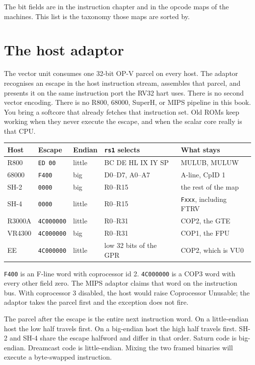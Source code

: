 The bit fields are in the instruction chapter and in the opcode maps of the machines. This list is the taxonomy those maps are sorted by.

\section{The host adaptor}

The vector unit consumes one 32-bit OP-V parcel on every host. The adaptor recognises an escape in the host instruction stream, assembles that parcel, and presents it on the same instruction port the RV32 hart uses. There is no second vector encoding. There is no R800, 68000, SuperH, or MIPS pipeline in this book. You bring a softcore that already fetches that instruction set. Old ROMs keep working when they never execute the escape, and when the scalar core really is that CPU.

\begin{center}
\small
\begin{tabular}{@{}lp{2.3cm}lp{3.4cm}p{3.6cm}@{}}
\toprule
Host & Escape & Endian & \texttt{rs1} selects & What stays \\
\midrule
R800 & \texttt{ED 00} & little & BC DE HL IX IY SP & MULUB, MULUW \\
68000 & \texttt{F400} & big & D0--D7, A0--A7 & A-line, CpID 1 \\
SH-2 & \texttt{0000} & big & R0--R15 & the rest of the map \\
SH-4 & \texttt{0000} & little & R0--R15 & \texttt{Fxxx}, including FTRV \\
R3000A & \texttt{4C000000} & little & R0--R31 & COP2, the GTE \\
VR4300 & \texttt{4C000000} & big & R0--R31 & COP1, the FPU \\
EE & \texttt{4C000000} & little & low 32 bits of the GPR & COP2, which is VU0 \\
\bottomrule
\end{tabular}
\end{center}

\texttt{F400} is an F-line word with coprocessor id 2. \texttt{4C000000} is a COP3 word with every other field zero. The MIPS adaptor claims that word on the instruction bus. With coprocessor 3 disabled, the host would raise Coprocessor Unusable; the adaptor takes the parcel first and the exception does not fire.

The parcel after the escape is the entire next instruction word. On a little-endian host the low half travels first. On a big-endian host the high half travels first. SH-2 and SH-4 share the escape halfword and differ in that order. Saturn code is big-endian. Dreamcast code is little-endian. Mixing the two framed binaries will execute a byte-swapped instruction.

